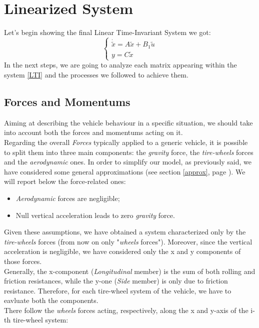 \documentclass[a4paper,12pt,titlepage]{report}
\begin{document}
\section{Linearized System} 
	Let's begin showing the final Linear Time-Invariant System we got:
		\begin{equation} \label{LTI}
			\begin{cases}
				\dot{\tilde{x}} = A \tilde{x} + B_{1}\tilde{u} \\
				y = C\tilde{x} 
			\end{cases}
		\end{equation}
	In the next steps, we are going to analyze each matrix appearing within the system \ref{LTI} and the processes we followed to achieve them.
	\subsection{Forces and Momentums}
		Aiming at describing the vehicle behaviour in a specific situation, we should take into account both the forces and momentums acting on it. \\ Regarding the overall \textit{Forces} typically applied to a generic vehicle, it is possible to split them into three main components: the \textit{gravity} force, the \textit{tire-wheels} forces and the \textit{aerodynamic} ones. In order to simplify our model, as previously said, we have considered some general approximations (see section \ref{approx}, page \pageref{approx}). We will report below the force-related ones:
		\begin{itemize}
			\item \textit{Aerodynamic} forces are negligible;
			\item Null vertical acceleration leads to zero \textit{gravity} force.
		\end{itemize}
		Given these assumptions, we have obtained a system characterized only by the \textit{tire-wheels} forces (from now on only "\textit{wheels} forces"). Moreover, since the vertical acceleration is negligible, we have considered only the x and y components of those forces. \\ Generally, the x-component (\textit{Longitudinal} member) is the sum of both rolling and friction resistances, while the y-one (\textit{Side} member) is only due to friction resistance. 
		Therefore, for each tire-wheel system of the vehicle, we have to eavluate both the components. \\
		There follow the \textit{wheels} forces acting, respectively, along the x and y-axis of the i-th tire-wheel system:
\end{document}
